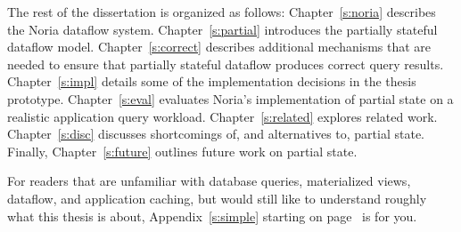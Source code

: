 The rest of the dissertation is organized as follows: Chapter~\ref{s:noria}
describes the Noria dataflow system. Chapter~\ref{s:partial} introduces the
partially stateful dataflow model. Chapter~\ref{s:correct} describes additional
mechanisms that are needed to ensure that partially stateful dataflow produces
correct query results. Chapter~\ref{s:impl} details some of the implementation
decisions in the thesis prototype. Chapter~\ref{s:eval} evaluates Noria's
implementation of partial state on a realistic application query workload.
Chapter~\ref{s:related} explores related work. Chapter~\ref{s:disc} discusses
shortcomings of, and alternatives to, partial state. Finally,
Chapter~\ref{s:future} outlines future work on partial state.

For readers that are unfamiliar with database queries, materialized views,
dataflow, and application caching, but would still like to understand roughly
what this thesis is about, Appendix~\ref{s:simple} starting on
page~\pageref{s:simple} is for you.
